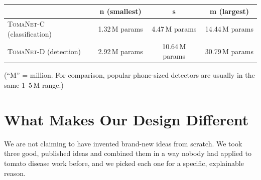 \documentclass[11pt,a4paper]{article}
\newcommand{\modelcls}{\textsc{TomaNet-C}}
\newcommand{\modeldet}{\textsc{TomaNet-D}}
\begin{document}
\begin{center}
\begin{tabular}{@{}lccc@{}}
\toprule
 & \textbf{n (smallest)} & \textbf{s} & \textbf{m (largest)} \\
\midrule
\modelcls{} (classification) & 1.32\,M params & 4.47\,M params & 14.44\,M params \\
\modeldet{} (detection) & 2.92\,M params & 10.64\,M params & 30.79\,M params \\
\bottomrule
\end{tabular}
\end{center}
\vspace{2mm}
\noindent (``M'' = million. For comparison, popular phone-sized detectors are usually in
the same 1--5\,M range.)

\section{What Makes Our Design Different}
We are not claiming to have invented brand-new ideas from scratch. We took three good,
published ideas and combined them in a way nobody had applied to tomato disease work
before, and we picked each one for a specific, explainable reason.
\end{document}
